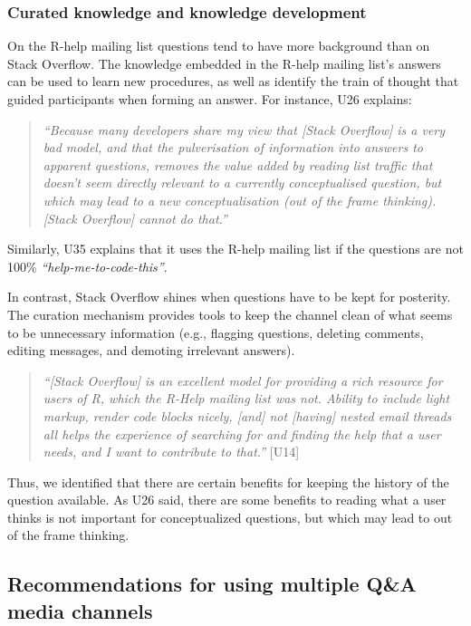 \documentclass{sig-alternate-05-2015}
\begin{document}
	\subsubsection{Curated knowledge and knowledge development}

	On the R-help mailing list questions tend to have more background than on Stack Overflow.
	The knowledge embedded in the R-help mailing list's answers can be used to learn new procedures, as well as identify the train of thought that guided participants when forming an answer.
	For instance, U26 explains:
    \begin{quote}
	    \textit{``Because many developers share my view that [Stack Overflow] is a very bad model, and that the pulverisation of information into answers to apparent questions, removes the value added by reading list traffic that doesn't seem directly relevant to a currently conceptualised question, but which may lead to a new conceptualisation (out of the frame thinking). [Stack Overflow] cannot do that.''}
    \end{quote}
	Similarly, U35 explains that it uses the R-help mailing list if the questions are not 100\% \textit{``help-me-to-code-this''}.

	In contrast, Stack Overflow shines when questions have to be kept for posterity. 
	The curation mechanism provides tools to keep the channel clean of what seems to be unnecessary information (e.g., flagging questions, deleting comments, editing messages, and demoting irrelevant answers).

    \begin{quote}
        \textit{``[Stack Overflow] is an excellent model for providing a rich resource for users of R, which the R-Help mailing list was not. 
        Ability to include light markup, render code blocks nicely, [and] not [having] nested email threads all helps the experience of searching for and finding the help that a user needs, and I want to contribute to that.''} [U14]
	\end{quote}

Thus, we identified that there are certain benefits for keeping the history of the question available.
As U26 said, there are some benefits to reading what a user thinks is not important for conceptualized questions, but which may lead to out of the frame thinking. 


\subsection{Recommendations for using multiple Q\&A media channels}
\end{document}
